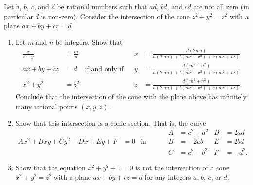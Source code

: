 \documentclass[12 pt, letterpaper]{hmcpset}
\begin{document}
\begin{problem}[2]
	Let $a$, $b$, $c$, and $d$ be rational numbers such that $ad$, $bd$, and $cd$ are not all zero (in particular $d$ is non-zero). Consider the intersection of the cone $z^{2} + y^{2} = z^{2}$ with a plane $ax + by + cz = d$.
	\begin{enumerate}
		\item Let $m$ and $n$ be integers. Show that
			\begin{align*}
				\frac{x}{z - y} & = \frac{m}{n} & & & x & = \frac{d (2 m n)}{a (2 m n) + b (m^{2} - n^{2}) + c(m^{2} + n^{2})} \\
				ax + by + cz & = d & \text{if and only if} & & y & = \frac{d (m^{2} - n^{2})}{a (2 m n) + b (m^{2} - n^{2}) + c(m^{2} + n^{2})} \\
				x^{2} + y^{2} & = z^{2} & & & z & = \frac{d (m^{2} + n^{2})}{a (2 m n) + b (m^{2} - n^{2}) + c(m^{2} + n^{2})}.
			\end{align*}
			Conclude that the intersection of the cone with the plane above has infinitely many rational points $(x, y, z)$.
		\item Show that this intersection is a conic section. That is, the curve
			\begin{align*}
				& & & & A & = c^{2} - a^{2} & D & = 2 a d \\
				A x^{2} + B x y + C y^{2} + D x + E y + F & = 0 & \text{in terms of} & & B & = -2 a b & E & = 2 b d \\
									  & & & & C & = c^{2} - b^{2} & F & = -d^{2}.
			\end{align*}
		\item Show that the equation $x^{2} + y^{2} + 1 = 0$ is not the intersection of a cone $x^{2} + y^{2} = z^{2}$ with a plane $ax + by + cz = d$ for any integers $a$, $b$, $c$, or $d$.
	\end{enumerate}
\end{problem}

\pagebreak
\end{document}
